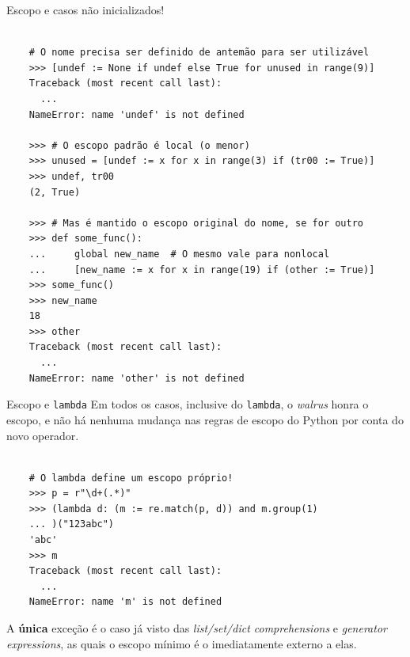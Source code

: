 \documentclass[utf8]{beamer}
\begin{document}
\begin{frame}[fragile]{Escopo e casos não inicializados!}
  \vspace{-1em}
  \begin{verbatim}

    # O nome precisa ser definido de antemão para ser utilizável
    >>> [undef := None if undef else True for unused in range(9)]
    Traceback (most recent call last):
      ...
    NameError: name 'undef' is not defined

    >>> # O escopo padrão é local (o menor)
    >>> unused = [undef := x for x in range(3) if (tr00 := True)]
    >>> undef, tr00
    (2, True)

    >>> # Mas é mantido o escopo original do nome, se for outro
    >>> def some_func():
    ...     global new_name  # O mesmo vale para nonlocal
    ...     [new_name := x for x in range(19) if (other := True)]
    >>> some_func()
    >>> new_name
    18
    >>> other
    Traceback (most recent call last):
      ...
    NameError: name 'other' is not defined

  \end{verbatim}
\end{frame}


\begin{frame}[fragile]{Escopo e \texttt{lambda}}
  Em todos os casos, inclusive do \texttt{lambda},
  o \emph{walrus} honra o escopo,
  e não há nenhuma mudança nas regras de escopo do Python
  por conta do novo operador.
  \vfill
  \begin{verbatim}

    # O lambda define um escopo próprio!
    >>> p = r"\d+(.*)"
    >>> (lambda d: (m := re.match(p, d)) and m.group(1)
    ... )("123abc")
    'abc'
    >>> m
    Traceback (most recent call last):
      ...
    NameError: name 'm' is not defined

  \end{verbatim}
  \vfill
  A \textbf{única} exceção é o caso já visto
  das \emph{list/set/dict comprehensions}
  e \emph{generator expressions},
  as quais o escopo mínimo é o imediatamente externo a elas.
\end{frame}
\end{document}
